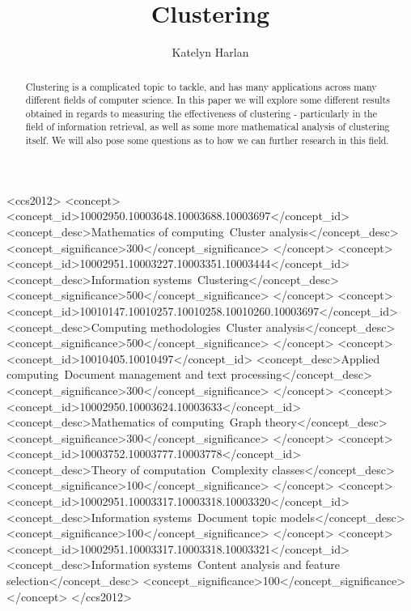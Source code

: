 \documentclass[sigconf,authorversion,nonacm]{acmart}
\begin{document}
\title{Clustering}
\author{Katelyn Harlan}


\begin{abstract}
Clustering is a complicated topic to tackle, and has many applications across many different fields of computer science. In this paper we will explore some different results obtained in regards to measuring the effectiveness of clustering - particularly in the field of information retrieval, as well as some more mathematical analysis of clustering itself. We will also pose some questions as to how we can further research in this field.
\end{abstract}

\begin{CCSXML}
<ccs2012>
   <concept>
       <concept_id>10002950.10003648.10003688.10003697</concept_id>
       <concept_desc>Mathematics of computing~Cluster analysis</concept_desc>
       <concept_significance>300</concept_significance>
       </concept>
   <concept>
       <concept_id>10002951.10003227.10003351.10003444</concept_id>
       <concept_desc>Information systems~Clustering</concept_desc>
       <concept_significance>500</concept_significance>
       </concept>
   <concept>
       <concept_id>10010147.10010257.10010258.10010260.10003697</concept_id>
       <concept_desc>Computing methodologies~Cluster analysis</concept_desc>
       <concept_significance>500</concept_significance>
       </concept>
   <concept>
       <concept_id>10010405.10010497</concept_id>
       <concept_desc>Applied computing~Document management and text processing</concept_desc>
       <concept_significance>300</concept_significance>
       </concept>
   <concept>
       <concept_id>10002950.10003624.10003633</concept_id>
       <concept_desc>Mathematics of computing~Graph theory</concept_desc>
       <concept_significance>300</concept_significance>
       </concept>
   <concept>
       <concept_id>10003752.10003777.10003778</concept_id>
       <concept_desc>Theory of computation~Complexity classes</concept_desc>
       <concept_significance>100</concept_significance>
       </concept>
   <concept>
       <concept_id>10002951.10003317.10003318.10003320</concept_id>
       <concept_desc>Information systems~Document topic models</concept_desc>
       <concept_significance>100</concept_significance>
       </concept>
   <concept>
       <concept_id>10002951.10003317.10003318.10003321</concept_id>
       <concept_desc>Information systems~Content analysis and feature selection</concept_desc>
       <concept_significance>100</concept_significance>
       </concept>
 </ccs2012>
\end{CCSXML}
\end{document}
